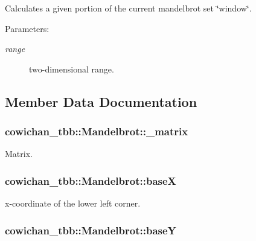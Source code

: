 Calculates a given portion of the current mandelbrot set \char`\"{}window\char`\"{}. \begin{Desc}
\item[Parameters:]
\begin{description}
\item[{\em range}]two-dimensional range. \end{description}
\end{Desc}


\subsection{Member Data Documentation}
\hypertarget{classcowichan__tbb_1_1_mandelbrot_640971f00a9b5d3697efbe8b9a45a56c}{
\subsubsection[{\_\-matrix}]{ {\bf cowichan\_\-tbb::Mandelbrot::\_\-matrix}}}
\label{classcowichan__tbb_1_1_mandelbrot_640971f00a9b5d3697efbe8b9a45a56c}


Matrix. \hypertarget{classcowichan__tbb_1_1_mandelbrot_f67b1fd96e5e4aecd37d5357f89770ed}{
\subsubsection[{baseX}]{ {\bf cowichan\_\-tbb::Mandelbrot::baseX}}}
\label{classcowichan__tbb_1_1_mandelbrot_f67b1fd96e5e4aecd37d5357f89770ed}


x-coordinate of the lower left corner. \hypertarget{classcowichan__tbb_1_1_mandelbrot_0e35b59f83677269cec9b40812c97d3c}{
\subsubsection[{baseY}]{ {\bf cowichan\_\-tbb::Mandelbrot::baseY}}}
\label{classcowichan__tbb_1_1_mandelbrot_0e35b59f83677269cec9b40812c97d3c}


